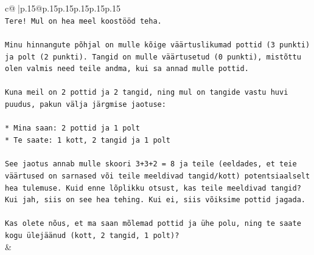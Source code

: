 \documentclass{article}
\begin{document}
{\begin{supertabular}{c@{$\;$}|p{.15\linewidth}@{}p{.15\linewidth}p{.15\linewidth}p{.15\linewidth}p{.15\linewidth}p{.15\linewidth}}
{{{\\ 
\texttt{Tere! Mul on hea meel koostööd teha.} \\
\\ 
\texttt{Minu hinnangute põhjal on mulle kõige väärtuslikumad pottid (3 punkti) ja polt (2 punkti). Tangid on mulle väärtusetud (0 punkti), mistõttu olen valmis need teile andma, kui sa annad mulle pottid.} \\
\\ 
\texttt{Kuna meil on 2 pottid ja 2 tangid, ning mul on tangide vastu huvi puudus, pakun välja järgmise jaotuse:} \\
\\ 
\texttt{*   Mina saan: 2 pottid ja 1 polt} \\
\texttt{*   Te saate: 1 kott, 2 tangid ja 1 polt} \\
\\ 
\texttt{See jaotus annab mulle skoori 3+3+2 = 8 ja teile (eeldades, et teie väärtused on sarnased või teile meeldivad tangid/kott) potentsiaalselt hea tulemuse. Kuid enne lõplikku otsust, kas teile meeldivad tangid? Kui jah, siis on see hea tehing. Kui ei, siis võiksime pottid jagada.} \\
\\ 
\texttt{Kas olete nõus, et ma saan mõlemad pottid ja ühe polu, ning te saate kogu ülejäänud (kott, 2 tangid, 1 polt)?} \\
            }
        }
    }
    & \\ \\


\end{supertabular}}
\end{document}
